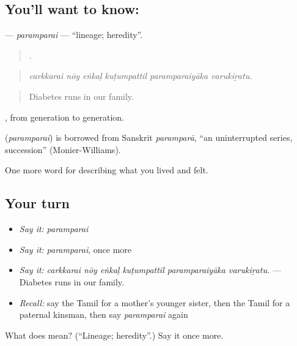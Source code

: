\subsection*{You'll want to know: }
\textbf{} — \emph{paramparai} — \textquotedblleft{}lineage; heredity\textquotedblright{}.

\begin{quote}
     .
\end{quote}

\begin{quote}
\emph{carkkarai nōy eṅkaḷ kuṭumpattil paramparaiyāka varukiṟatu.}
\end{quote}

\begin{quote}
Diabetes runs in our family.
\end{quote}

, from generation to generation.

\begin{cousinweb}
\textbf{} (\emph{paramparai}) is borrowed from Sanskrit \emph{paramparā}, \textquotedblleft{}an uninterrupted series, succession\textquotedblright{} (Monier-Williams).
\end{cousinweb}

\begin{grammarlens}[title={What you've built}]
One more word for describing what you lived and felt.
\end{grammarlens}

\subsection*{Your turn}
\begin{itemize}
\raggedright
  \item \emph{Say it:} \emph{paramparai}
  \item \emph{Say it:} \emph{paramparai}, once more
  \item \emph{Say it:} \emph{carkkarai nōy eṅkaḷ kuṭumpattil paramparaiyāka varukiṟatu.} — Diabetes runs in our family.
  \item \emph{Recall:} say the Tamil for a mother’s younger sister, then the Tamil for a paternal kinsman, then say \emph{paramparai} again
\end{itemize}

\begin{tcolorbox}[breakable,colback=teal!4,colframe=teal!35!black,title={Before you move on}]
What does  mean? (\textquotedblleft{}Lineage; heredity\textquotedblright{}.) Say it once more.
\end{tcolorbox}
